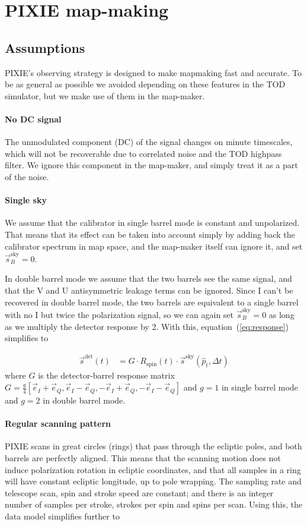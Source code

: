 \documentclass{article}
\begin{document}
\section{PIXIE map-making}
\subsection{Assumptions}
PIXIE's observing strategy is designed to make mapmaking
fast and accurate. To be as general as possible we avoided depending
on these features in the TOD simulator, but we make use of them
in the map-maker.

\paragraph{No DC signal}
The unmodulated component (DC) of the signal changes on minute timescales,
which will not be recoverable due to correlated noise and the TOD highpass
filter. We ignore this component in the map-maker, and simply treat it as
a part of the noise.

\paragraph{Single sky}
We assume that the calibrator in single barrel mode is constant and
unpolarized. That means that its effect can be taken into account
simply by adding back the calibrator spectrum in map space, and
the map-maker itself can ignore it, and set $\vec s^\textrm{sky}_B=0$.

In double barrel mode we assume that the two barrels see the same signal,
and that the V and U antisymmetric leakage terms can be ignored.
Since I can't be recovered in double barrel mode, the two barrels are
equivalent to a single barrel with no I but twice the polarization signal,
so we can again set $\vec s^\textrm{sky}_B=0$ as long as we multiply the
detector response by 2. With this, equation~(\ref{eq:response}) simplifies
to

\begin{align}
	\vec s^\textrm{det}(t) &=
		G \cdot R_\textrm{spin}(t)\cdot\vec s^\textrm{sky}(\hat p_t,\Delta t)
\end{align}
where $G$ is the detector-barrel response matrix
$G = \frac{g}{4}[\vec e_I+\vec e_Q,\vec e_I-\vec e_Q,-\vec e_I+\vec e_Q,
-\vec e_I-\vec e_Q]$ and $g = 1$ in single barrel mode and $g = 2$ in
double barrel mode.

\paragraph{Regular scanning pattern}
PIXIE scans in great circles (rings) that pass through the ecliptic poles,
and both barrels are perfectly aligned. This means that the scanning motion
does not induce polarization rotation in ecliptic coordinates, and that all
samples in a ring will have constant ecliptic longitude, up to pole wrapping.
The sampling rate and telescope scan, spin and stroke speed are constant;
and there is an integer number of samples per stroke, strokes per spin and spins
per scan. Using this, the data model simplifies further to
\end{document}
